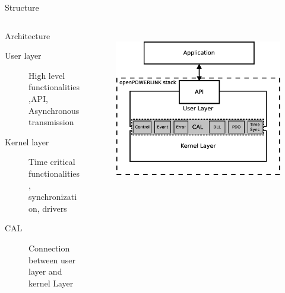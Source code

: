 \begin{frame}{Structure}
    \begin{columns}
        \begin{column}{0.5\textwidth}
            \begin{block}{Architecture}
                \begin{description}
                    \item[User layer] High level functionalities,API, Asynchronous transmission
                    \item[Kernel layer] Time critical functionalities, synchronization, drivers
                    \item[CAL] Connection between user layer and kernel Layer
                \end{description}
            \end{block}
        \end{column}
        
        \begin{column}{0.5\textwidth}
            \begin{figure}
                \hbox{
                \hspace{-2ex}
                \includegraphics[width=1.2\textwidth]{../../thesis/images/openpowerlink_arch.eps}}
            \end{figure}
        \end{column}
    \end{columns}
\end{frame}

